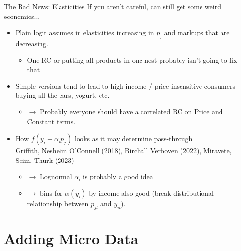 \documentclass[aspectratio=169,10pt]{beamer}
\begin{document}
\begin{frame}{The Bad News: Elasticities}
If you aren't careful, can still get some weird economics...
\begin{itemize}
\item Plain logit assumes in \alert{elasticities increasing in $p_j$} and \alert{markups that are decreasing}.\\
\begin{itemize}
\item One RC or putting all products in one nest probably isn't going to fix that
\end{itemize}
\item Simple versions tend to lead to \alert{high income} / \alert{price insensitive} consumers buying all the cars, yogurt, etc.
\begin{itemize}
\item $\rightarrow$ Probably everyone should have a \alert{correlated} RC on Price and Constant terms.
\end{itemize}

\item How $f(y_i - \alpha_i p_j)$ looks as it may determine \alert{pass-through}
\\
Griffith, Nesheim O'Connell (2018), Birchall Verboven (2022), Miravete, Seim, Thurk (2023)
\begin{itemize}
\item $\rightarrow$ Lognormal $\alpha_i$ is probably a good idea
\item $\rightarrow$ bins for $\alpha(y_i)$ by income also good (break distributional relationship between $p_{jt}$ and $y_{it}$).
\end{itemize}

\end{itemize}
\end{frame}

\section*{Adding Micro Data}
\end{document}
